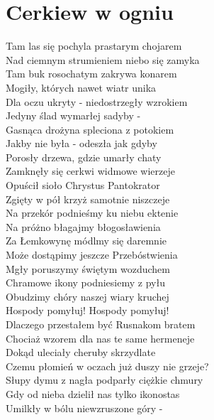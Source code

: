 \section{Cerkiew w ogniu}
\begin{minipage}[t]{\dimexpr.4\textwidth-.4\columnsep}
    \footnotesize{
    Tam las się pochyla prastarym chojarem\\
    Nad ciemnym strumieniem niebo się zamyka\\
    Tam buk rosochatym zakrywa konarem\\
    Mogiły, których nawet wiatr unika\\
    \hfill\break
    Dla oczu ukryty - niedostrzegły wzrokiem\\
    Jedyny ślad wymarłej sadyby -\\
    Gasnąca drożyna spleciona z potokiem\\
    Jakby nie była - odeszła jak gdyby\\
    \hfill\break
    Porosły drzewa, gdzie umarły chaty\\
    Zamknęły się cerkwi widmowe wierzeje\\
    Opuścił sioło Chrystus Pantokrator\\
    Zgięty w pół krzyż samotnie niszczeje\\
    \hfill\break
    \vin Na przekór podnieśmy ku niebu ektenie\\
    \vin Na próżno błagajmy błogosławienia\\
    \vin Za Łemkowynę módlmy się daremnie\\
    \vin Może dostąpimy jeszcze Przebóstwienia\\
    \hfill\break
    \vin Mgły poruszymy świętym wozduchem\\
    \vin Chramowe ikony podniesiemy z pyłu\\
    \vin Obudzimy chóry naszej wiary kruchej\\
    \vin Hospody pomyłuj! Hospody pomyłuj!\\
    \hfill\break
    Dlaczego przestałem być Rusnakom bratem\\
    Chociaż wzorem dla nas te same hermeneje\\
    Dokąd uleciały cheruby skrzydlate\\
    Czemu płomień w oczach już duszy nie grzeje?\\
    \hfill\break
    Słupy dymu z nagła podparły ciężkie chmury\\
    Gdy od nieba dzielił nas tylko ikonostas\\
    Umilkły w bólu niewzruszone góry -\\
}
\end{minipage}
